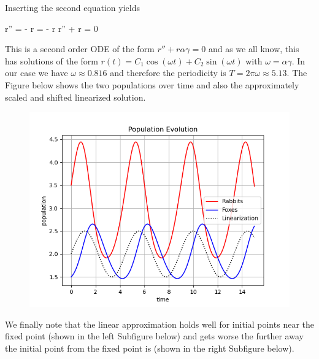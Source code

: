 Inserting the second equation yields

\bee
    r'' = - \frac{\beta \gamma}{\delta} \frac{\delta \alpha}{\beta} r = - \alpha \gamma r \rightarrow r'' + \alpha \gamma r = 0
\eee

This is a second order ODE of the form $r'' + r \alpha \gamma = 0$ and as we all know, this has solutions of the form $r(t) = C_1 \cos(\omega t) + C_2 \sin(\omega t)$ with $\omega = \alpha \gamma$. In our case we have $\omega \approx 0.816$ and therefore the periodicity is $T = 2 \pi \omega \approx 5.13$. The Figure below shows the two populations over time and also the approximately scaled and shifted linearized solution.

\begin{figure}[H]
    \centering
    \includegraphics[scale=0.75]{images/2024-06-05-pred_prey_20.png}
\end{figure}

We finally note that the linear approximation holds well for initial points near the fixed point (shown in the left Subfigure below) and gets worse the further away the initial point from the fixed point is (shown in the right Subfigure below).

